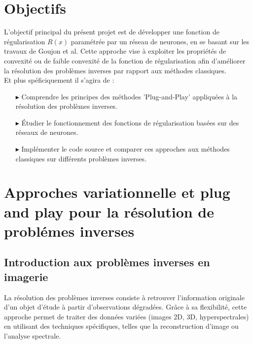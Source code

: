 \documentclass[a4paper, 12pt]{report} %
\begin{document}
\tableofcontents 

\newpage


\chapter*{Objectifs }
L'objectif principal du présent projet est de développer une fonction de régularisation \( R(x) \) paramétrée par un réseau de neurones, en se basant sur les travaux de Goujon et al. Cette approche vise à exploiter les propriétés de convexité ou de faible convexité de la fonction de régularisation afin d'améliorer la résolution des problèmes inverses par rapport aux méthodes classiques.\\

Et plus spéficiquement il s'agira de :
\begin{itemize}
    \item [$\blacktriangleright$] Comprendre les principes des méthodes 'Plug-and-Play' appliquées à la résolution des problèmes inverses.
    \item [$\blacktriangleright$] Étudier le fonctionnement des fonctions de régularisation basées sur des réseaux de neurones.
    \item [$\blacktriangleright$] Implémenter le code source et comparer ces approches aux méthodes classiques sur différents problèmes inverses.
\end{itemize} 

\newpage


\chapter{Approches variationnelle et plug and play pour la résolution de problémes inverses}


\section{Introduction aux  problèmes inverses en imagerie}
 
La résolution des problèmes inverses consiste à retrouver l'information originale d'un objet d'étude à partir d'observations dégradées. Grâce à sa flexibilité, cette approche permet de traiter des données variées (images 2D, 3D, hyperspectrales) en utilisant des techniques spécifiques, telles que la reconstruction d'image ou l'analyse spectrale.
\end{document}
